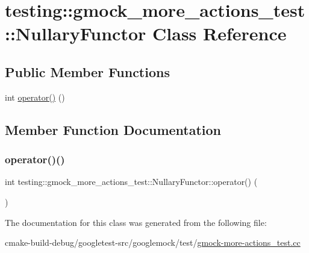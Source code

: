 \hypertarget{classtesting_1_1gmock__more__actions__test_1_1NullaryFunctor}{}\section{testing\+::gmock\+\_\+more\+\_\+actions\+\_\+test\+::Nullary\+Functor Class Reference}
\label{classtesting_1_1gmock__more__actions__test_1_1NullaryFunctor}
\subsection*{Public Member Functions}
\begin{DoxyCompactItemize}
\item 
int \mbox{\hyperlink{classtesting_1_1gmock__more__actions__test_1_1NullaryFunctor_a50f1e39b9ee381693e8bb871acf4e3a9}{operator()}} ()
\end{DoxyCompactItemize}


\subsection{Member Function Documentation}
\mbox{\label{classtesting_1_1gmock__more__actions__test_1_1NullaryFunctor_a50f1e39b9ee381693e8bb871acf4e3a9}} 
\subsubsection{\texorpdfstring{operator()()}{operator()()}}
{\footnotesize\ttfamily int testing\+::gmock\+\_\+more\+\_\+actions\+\_\+test\+::\+Nullary\+Functor\+::operator() (\begin{DoxyParamCaption}{ }\end{DoxyParamCaption})\hspace{0.3cm}{\ttfamily [inline]}}



The documentation for this class was generated from the following file\+:\begin{DoxyCompactItemize}
\item 
cmake-\/build-\/debug/googletest-\/src/googlemock/test/\mbox{\hyperlink{gmock-more-actions__test_8cc}{gmock-\/more-\/actions\+\_\+test.\+cc}}\end{DoxyCompactItemize}
